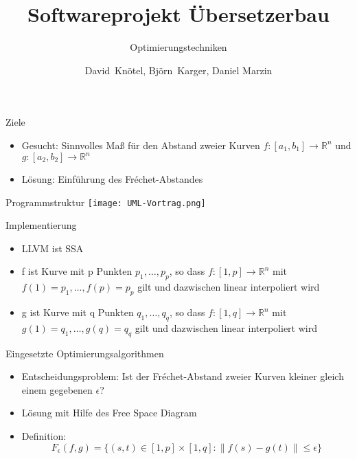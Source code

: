 \documentclass[ucs,9pt]{beamer}
\title[Softwareprojekt Übersetzerbau]
{Softwareprojekt Übersetzerbau}
\subtitle{Optimierungstechniken}
\author[Knötel, Karger, Marzin] %
{David~Knötel, Björn~Karger, Daniel Marzin}
\institute[FU Berlin] %
{Freie Universität Berlin, Institut für Informatik}
\date[20.07.2012] %
{}
\begin{document}
\frame[plain]{\titlepage}



\begin{frame}{Ziele}
\begin{itemize}
\item Gesucht: Sinnvolles Maß für den Abstand zweier Kurven $f:[a_1,b_1]\rightarrow \mathds{R}^n$ und $g:[a_2,b_2]\rightarrow \mathds{R}^n$
\vspace{3mm}
\item Lösung: Einführung des Fréchet-Abstandes
\end{itemize}
\end{frame}

\begin{frame}{Programmstruktur}
	\texttt{[image: UML-Vortrag.png]}
\end{frame}

\begin{frame}{Implementierung}
\begin{itemize}
\item LLVM ist SSA
\vspace{3mm}
\item f ist Kurve mit p Punkten $p_1,\dots ,p_p$, so dass $f:[1,p]\rightarrow \mathds{R}^n$ mit $f(1) = p_1,\dots ,f(p) = p_p$ gilt und dazwischen linear interpoliert wird
\vspace{3mm}
\item g ist Kurve mit q Punkten $q_1,\dots ,q_q$, so dass $f:[1,q]\rightarrow \mathds{R}^n$ mit $g(1) = q_1,\dots ,g(q) = q_q$ gilt und dazwischen linear interpoliert wird
\end{itemize}
\end{frame}

\begin{frame}{Eingesetzte Optimierungsalgorithmen}
\begin{itemize}
\item Entscheidungsproblem: Ist der Fréchet-Abstand zweier Kurven kleiner gleich einem gegebenen $\epsilon$?
\vspace{3mm}
\item Lösung mit Hilfe des Free Space Diagram
\vspace{3mm}
\item Definition: $$F_\epsilon (f,g) = \{(s,t)\in [1,p] \times [1,q] : \|f(s) - g(t)\| \leq \epsilon \}$$
\end{itemize}
\end{frame}
\end{document}
